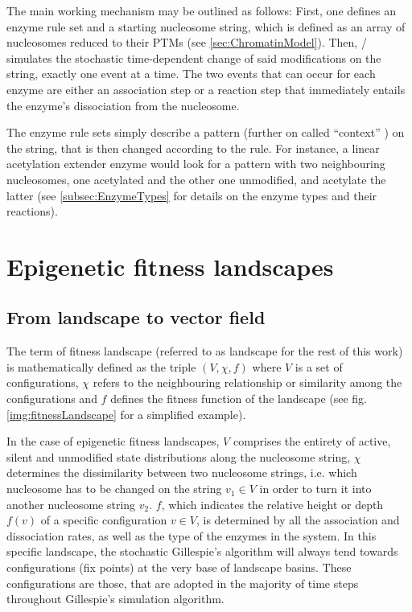             The main working mechanism may be outlined as follows: First, one defines an enzyme rule set and a starting nucleosome string, which is defined as an array of nucleosomes reduced to their PTMs (see \ref{sec:ChromatinModel}). Then, \ed/ simulates the stochastic time-dependent change of said modifications on the string, exactly one event at a time. The two events that can occur for each enzyme are either an association step or a reaction step that immediately entails the enzyme's dissociation from the nucleosome.

            The enzyme rule sets simply describe a pattern (further on called “context” %
            ) on the string, that is then changed according to the rule. For instance, a linear acetylation extender enzyme would look for a pattern with two neighbouring nucleosomes, one acetylated and the other one unmodified, and acetylate the latter (see \ref{subsec:EnzymeTypes} for details on the enzyme types and their reactions).

    \section{Epigenetic fitness landscapes} %
        \subsection{From landscape to vector field}
            The term of fitness landscape (referred to as landscape for the rest of this work) is mathematically defined as the triple $(V, \chi, f)$ where $V$ is a set of configurations, $\chi$ refers to the neighbouring relationship or similarity among the configurations and $f$ defines the fitness function of the landscape \cite{Stadler2002} (see fig. \ref{img:fitnessLandscape} for a simplified example).

            In the case of epigenetic fitness landscapes, $V$ comprises the entirety of active, silent and unmodified state distributions along the nucleosome string, $\chi$ determines the dissimilarity between two nucleosome strings, i.e. which nucleosome has to be changed on the string $v_1 \in V$ in order to turn it into another nucleosome string $v_2$. $f$, which indicates the relative height or depth $f(v)$ of a specific configuration $v \in V$, is determined by all the association and dissociation rates, as well as the type of the enzymes in the system. In this specific landscape, the stochastic Gillespie's algorithm will always tend towards configurations (fix points) at the very base of landscape basins. These configurations are those, that are adopted in the majority of time steps throughout Gillespie's simulation algorithm.\\ %

